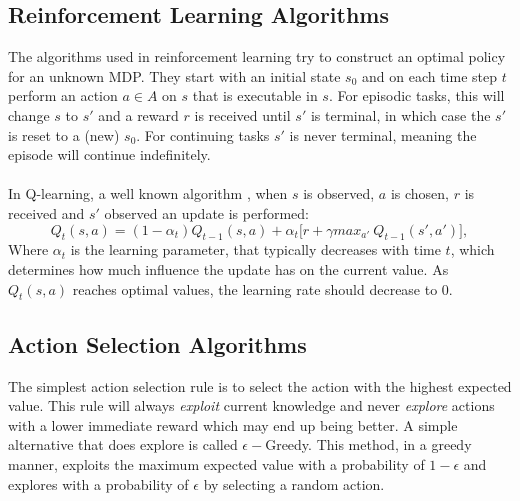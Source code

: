 \subsection{Reinforcement Learning Algorithms}
The algorithms used in reinforcement learning try to construct an optimal
policy for an unknown MDP. They start with an initial state $s_0$ and on each
time step $t$ perform an action $a \in A$ on $s$ that is executable in $s$. For
episodic tasks, this will change $s$ to $s'$ and a reward $r$ is received until
$s'$ is terminal, in which case the $s'$ is reset to a (new) $s_0$. For
continuing tasks $s'$ is never terminal, meaning the episode will continue
indefinitely.
\\ \\
In Q-learning, a well known algorithm \cite{sutton}, when $s$ is observed, $a$
is chosen, $r$ is received and $s'$ observed an update is performed:
\begin{equation}
Q_t(s,a) = (1-\alpha_t)Q_{t-1}(s,a) + \alpha_t\Big[r + \gamma max_{a'}~Q_{t-1}(s',a')\Big],
\label{eq:qlearn}
\end{equation}
Where $\alpha_t$ is the learning parameter, that typically decreases with time
$t$, which determines how much influence the update has on the current value.
As $Q_t(s,a)$ reaches optimal values, the learning rate should decrease to 0.

\subsection{Action Selection Algorithms}
The simplest action selection rule is to select the action with the highest
expected value. This rule will always \emph{exploit} current knowledge and
never \emph{explore} actions with a lower immediate reward which may end up
being better. A simple alternative that does explore is called
$\epsilon-$Greedy. This method, in a greedy manner, exploits the maximum
expected value with a probability of $1-\epsilon$ and explores with a
probability of $\epsilon$ by selecting a random action.

